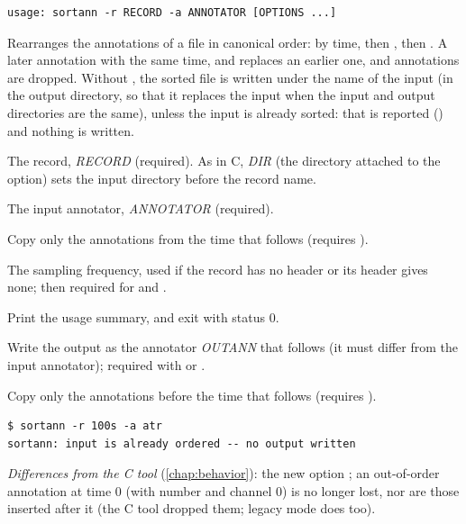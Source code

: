 \begin{lstlisting}[style=signature,language={}]
usage: sortann -r RECORD -a ANNOTATOR [OPTIONS ...]
\end{lstlisting}
Rearranges the annotations of a file in canonical order: by time, then , then
. A later annotation with the same time,  and  replaces an
earlier one, and  annotations are dropped. Without , the sorted file is
written under the name of the input (in the output directory, so that it replaces the
input when the input and output directories are the same), unless the input is already
sorted: that is reported ()
and nothing is written.
\begin{params}
\item[-r] The record, \textit{RECORD} (required). As in C, \textit{DIR} (the
  directory attached to the option) sets the input directory before the record name.
\item[-a] The input annotator, \textit{ANNOTATOR} (required).
\item[-f] Copy only the annotations from the time that follows (requires ).
\item[-F] The sampling frequency, used if the record has no header or its header gives
  none; then required for  and .
\item[-h] Print the usage summary, and exit with status 0.
\item[-o] Write the output as the annotator \textit{OUTANN} that follows (it must differ
  from the input annotator); required with  or .
\item[-t] Copy only the annotations before the time that follows (requires ).
\end{params}
\begin{lstlisting}[style=text]
$ sortann -r 100s -a atr
sortann: input is already ordered -- no output written
\end{lstlisting}
\textit{Differences from the C tool} (\cref{chap:behavior}): the new option ; an
out-of-order annotation at time 0 (with number and channel 0) is no longer lost, nor are
those inserted after it (the C tool dropped them; legacy mode does too).

